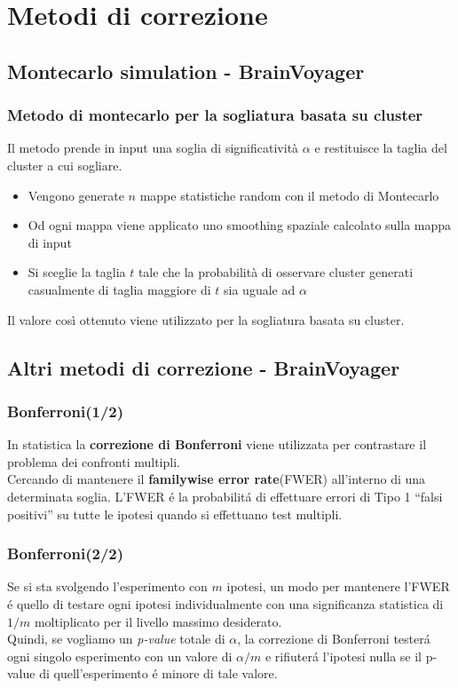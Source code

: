 \documentclass{beamer}
\begin{document}
\section{Metodi di correzione}
\subsection{Montecarlo simulation - BrainVoyager}
\begin{frame}
\frametitle{Metodo di montecarlo per la sogliatura basata su cluster}
Il metodo prende in input una soglia di significatività $\alpha$ e restituisce la taglia del cluster a cui sogliare.
\begin{itemize}
\item Vengono generate $n$ mappe statistiche random con il metodo di Montecarlo
\item Od ogni mappa viene applicato uno smoothing spaziale calcolato sulla mappa di input
\item Si sceglie la taglia $t$ tale che la probabilità di osservare cluster generati casualmente di taglia maggiore di $t$ sia uguale ad $\alpha$
\end{itemize}
Il valore così ottenuto viene utilizzato per la sogliatura basata su cluster. 
\end{frame}

\subsection{Altri metodi di correzione - BrainVoyager}
\begin{frame}
\frametitle{Bonferroni(1/2)}
In statistica la \textbf{correzione di Bonferroni} viene utilizzata per contrastare il problema dei confronti multipli.\\
\medskip
Cercando di mantenere il \textbf{familywise error rate}(FWER) all'interno di una determinata soglia.
\medskip
L'FWER \'e la probabilit\'a di effettuare errori di Tipo 1 ``falsi positivi'' su tutte le ipotesi quando si effettuano test multipli.
\end{frame}

\begin{frame}
\frametitle{Bonferroni(2/2)}
Se si sta svolgendo l'esperimento con $m$ ipotesi, un modo per mantenere l'FWER \'e quello di testare ogni ipotesi individualmente con una significanza statistica di $1/m$ moltiplicato per il livello massimo desiderato.
\\ \medskip
Quindi, se vogliamo un \emph{p-value} totale di $\alpha$, la correzione di Bonferroni tester\'a ogni singolo esperimento con un valore di $\alpha/m$ e rifiuter\'a l'ipotesi nulla se il p-value di quell'esperimento \'e minore di tale valore.
\end{frame}
\end{document}
